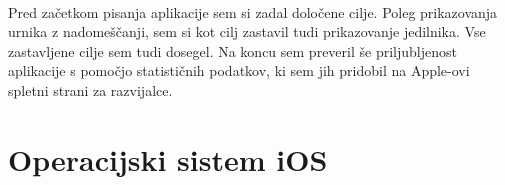\documentclass[a4paper, 12pt]{article}
\begin{document}
	\paragraph{} Pred začetkom pisanja aplikacije sem si zadal določene cilje. Poleg prikazovanja urnika z nadomeščanji, sem si kot cilj zastavil tudi prikazovanje jedilnika. Vse zastavljene cilje sem tudi dosegel. Na koncu sem preveril še priljubljenost aplikacije s pomočjo statističnih podatkov, ki sem jih pridobil na Apple-ovi spletni strani za razvijalce.
	
	\section{Operacijski sistem iOS}
\end{document}
